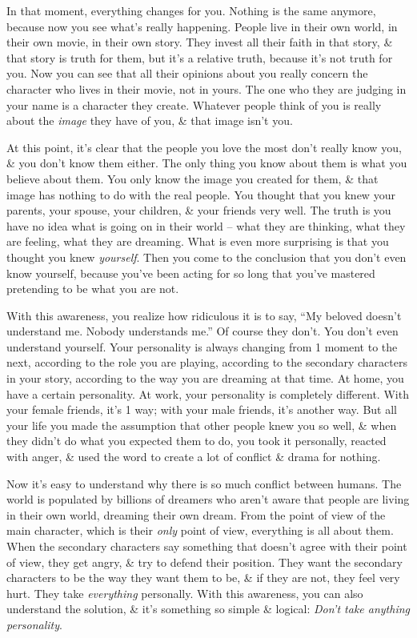 \documentclass{article}
\numberwithin{equation}{section}
\begin{document}
In that moment, everything changes for you. Nothing is the same anymore, because now you see what's really happening. People live in their own world, in their own movie, in their own story. They invest all their faith in that story, \& that story is truth for them, but it's a relative truth, because it's not truth for you. Now you can see that all their opinions about you really concern the character who lives in their movie, not in yours. The one who they are judging in your name is a character they create. Whatever people think of you is really about the \textit{image} they have of you, \& that image isn't you.

At this point, it's clear that the people you love the most don't really know you, \& you don't know them either. The only thing you know about them is what you believe about them. You only know the image you created for them, \& that image has nothing to do with the real people. You thought that you knew your parents, your spouse, your children, \& your friends very well. The truth is you have no idea what is going on in their world -- what they are thinking, what they are feeling, what they are dreaming. What is even more surprising is that you thought you knew \textit{yourself}. Then you come to the conclusion that you don't even know yourself, because you've been acting for so long that you've mastered pretending to be what you are not.

With this awareness, you realize how ridiculous it is to say, ``My beloved doesn't understand me. Nobody understands me.'' Of course they don't. You don't even understand yourself. Your personality is always changing from 1 moment to the next, according to the role you are playing, according to the secondary characters in your story, according to the way you are dreaming at that time. At home, you have a certain personality. At work, your personality is completely different. With your female friends, it's 1 way; with your male friends, it's another way. But all your life you made the assumption that other people knew you so well, \& when they didn't do what you expected them to do, you took it personally, reacted with anger, \& used the word to create a lot of conflict \& drama for nothing.

Now it's easy to understand why there is so much conflict between humans. The world is populated by billions of dreamers who aren't aware that people are living in their own world, dreaming their own dream. From the point of view of the main character, which is their \textit{only} point of view, everything is all about them. When the secondary characters say something that doesn't agree with their point of view, they get angry, \& try to defend their position. They want the secondary characters to be the way they want them to be, \& if they are not, they feel very hurt. They take \textit{everything} personally. With this awareness, you can also understand the solution, \& it's something so simple \& logical: \textit{Don't take anything personality}.
\end{document}
